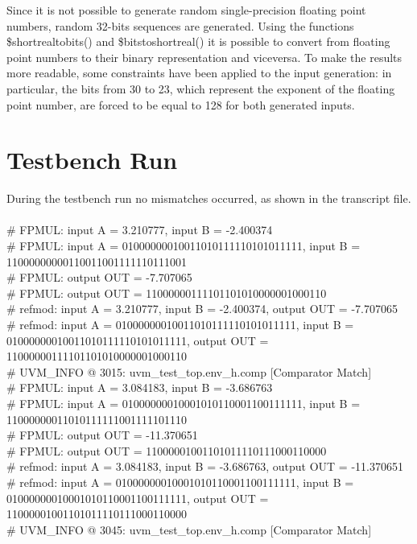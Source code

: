 Since it is not possible to generate random single-precision floating point numbers, random 32-bits sequences are generated. Using the functions \$shortrealtobits() 
and \$bitstoshortreal() it is possible to convert from floating point numbers to their binary representation and viceversa. To make the results more readable, 
some constraints have been applied to the input generation: in particular, the bits from 30 to 23, which represent the exponent of the floating point number, 
are forced to be equal to 128 for both generated inputs.

\section{Testbench Run}

During the testbench run no mismatches occurred, as shown in the transcript file.\\
\\
\# FPMUL: input A = 3.210777, input B = -2.400374\\
\# FPMUL: input A = 01000000010011010111110101011111, input B = 11000000000110011001111110111001\\
\# FPMUL: output OUT = -7.707065\\
\# FPMUL: output OUT = 11000000111101101010000001000110\\
\# refmod: input A = 3.210777, input B = -2.400374, output OUT = -7.707065\\
\# refmod: input A = 01000000010011010111110101011111, input B = 01000000010011010111110101011111, output OUT = 11000000111101101010000001000110\\
\# UVM\_INFO @ 3015: uvm\_test\_top.env\_h.comp [Comparator Match] \\
\# FPMUL: input A = 3.084183, input B = -3.686763\\
\# FPMUL: input A = 01000000010001010110001100111111, input B = 11000000011010111111001111101110\\
\# FPMUL: output OUT = -11.370651\\
\# FPMUL: output OUT = 11000001001101011110111000110000\\
\# refmod: input A = 3.084183, input B = -3.686763, output OUT = -11.370651\\
\# refmod: input A = 01000000010001010110001100111111, input B = 01000000010001010110001100111111, output OUT = 11000001001101011110111000110000\\
\# UVM\_INFO @ 3045: uvm\_test\_top.env\_h.comp [Comparator Match] \\
